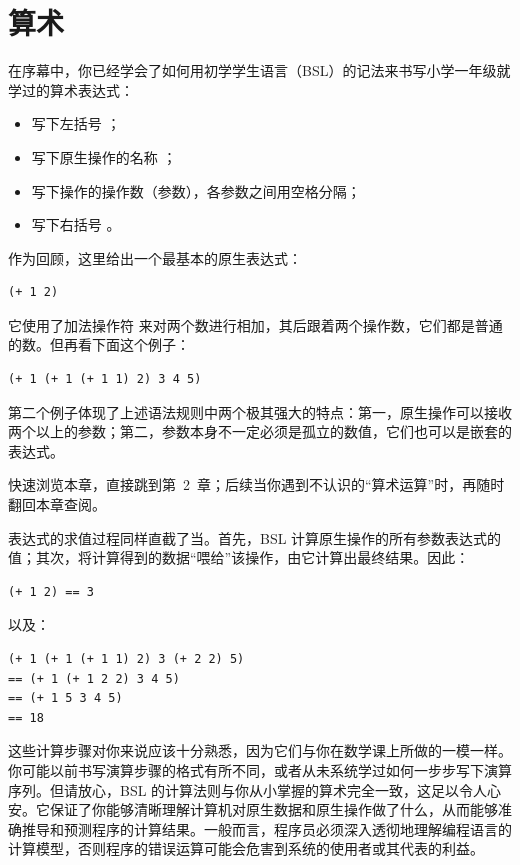 
\chapter{算术}
\label{sec:ch01_arithmetic}

在序幕中，你已经学会了如何用初学学生语言（BSL）的记法来书写小学一年级就学过的算术表达式：
\begin{itemize}
  \item 写下左括号 \code{(}；
  \item 写下原生操作的名称 ；
  \item 写下操作的操作数（参数），各参数之间用空格分隔；
  \item 写下右括号 \code{)}。
\end{itemize}

作为回顾，这里给出一个最基本的原生表达式：
\begin{lstlisting}[language=BSL]
(+ 1 2)
\end{lstlisting}

它使用了加法操作符 \code{+} 来对两个数进行相加，其后跟着两个操作数，它们都是普通的数。但再看下面这个例子：
\begin{lstlisting}[language=BSL]
(+ 1 (+ 1 (+ 1 1) 2) 3 4 5)
\end{lstlisting}

第二个例子体现了上述语法规则中两个极其强大的特点：第一，原生操作可以接收两个以上的参数；第二，参数本身不一定必须是孤立的数值，它们也可以是嵌套的表达式。

\begin{notebox}[阅读建议]
快速浏览本章，直接跳到第~2~章；后续当你遇到不认识的“算术运算”时，再随时翻回本章查阅。
\end{notebox}

表达式的求值过程同样直截了当。首先，BSL 计算原生操作的所有参数表达式的值；其次，将计算得到的数据“喂给”该操作，由它计算出最终结果。因此：
\begin{lstlisting}[language=BSL]
(+ 1 2) == 3
\end{lstlisting}
以及：
\begin{lstlisting}[language=BSL]
(+ 1 (+ 1 (+ 1 1) 2) 3 (+ 2 2) 5)
== (+ 1 (+ 1 2 2) 3 4 5)
== (+ 1 5 3 4 5)
== 18
\end{lstlisting}

这些计算步骤对你来说应该十分熟悉，因为它们与你在数学课上所做的一模一样。你可能以前书写演算步骤的格式有所不同，或者从未系统学过如何一步步写下演算序列。但请放心，BSL 的计算法则与你从小掌握的算术完全一致，这足以令人心安。它保证了你能够清晰理解计算机对原生数据和原生操作做了什么，从而能够准确推导和预测程序的计算结果。一般而言，程序员必须深入透彻地理解编程语言的计算模型，否则程序的错误运算可能会危害到系统的使用者或其代表的利益。


